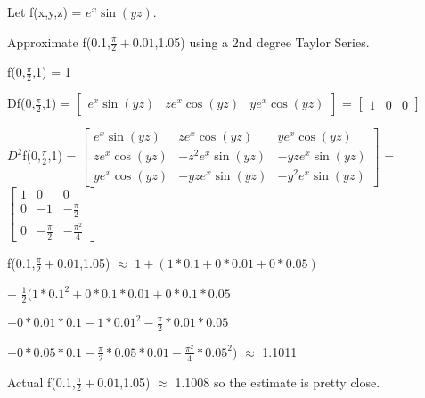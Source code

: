     \newpage



    \begin{example}
        Let f(x,y,z) = $e^x \sin(yz)$.
        
        Approximate f(0.1,$\frac{\pi}{2}+0.01$,1.05)
        using a 2nd degree Taylor Series.
    \end{example}

    \begin{tbox}
        f(0,$\frac{\pi}{2}$,1)
        = 1

        Df(0,$\frac{\pi}{2}$,1)
        = $\begin{bmatrix}
            e^x \sin(yz)
            & z e^x \cos(yz)
            & y e^x \cos(yz)
        \end{bmatrix}$
        = $\begin{bmatrix}
            1 & 0 & 0
        \end{bmatrix}$

        $D^2$f(0,$\frac{\pi}{2}$,1)
        = $\begin{bmatrix}
            e^x \sin(yz)
            & z e^x \cos(yz)
            & y e^x \cos(yz) \\

            z e^x \cos(yz)
            & -z^2 e^x \sin(yz)
            & -yz e^x \sin(yz) \\

            y e^x \cos(yz)
            & -yz e^x \sin(yz)
            & -y^2 e^x \sin(yz)
        \end{bmatrix}$
        = $\begin{bmatrix}
            1 & 0 & 0 \\
            0 & -1 & -\frac{\pi}{2} \\
            0 & -\frac{\pi}{2} & -\frac{\pi^2}{4}
        \end{bmatrix}$

        f(0.1,$\frac{\pi}{2}+0.01$,1.05)
        $\approx$ $1 + (1*0.1 + 0*0.01 + 0*0.05)$

        \hspace{4cm}
        + $\frac{1}{2}(1*0.1^2 + 0*0.1*0.01 + 0*0.1*0.05$

                        \hspace{5cm}
                        $+ 0*0.01*0.1 - 1*0.01^2 - \frac{\pi}{2}*0.01*0.05$

                        \hspace{5cm}
                        $+ 0*0.05*0.1 - \frac{\pi}{2}*0.05*0.01
                                        - \frac{\pi^2}{4}*0.05^2)$
                        $\approx$ 1.1011

        Actual f(0.1,$\frac{\pi}{2}+0.01$,1.05) $\approx$ 1.1008
        so the estimate is pretty close.
    \end{tbox}

